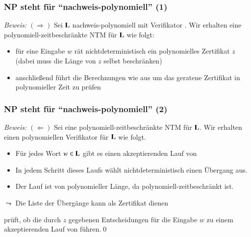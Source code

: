 \documentclass[onlymath]{beamer}
\begin{document}
\begin{frame}[t]\frametitle{NP steht für "`nachweis-polynomiell"' (1)}

\medskip\pause

\emph{Beweis:}
$(\Rightarrow)$ Sei $\textbf{\textcolor{black}{L}}$ nachweis-polynomiell mit Verifikator . Wir erhalten eine polynomiell-zeitbeschränkte NTM  für $\textbf{\textcolor{black}{L}}$ wie folgt:\pause
\begin{itemize}
\item für eine Eingabe $w$ rät  nichtdeterministisch ein polynomielles Zertifikat $z$\\
(dabei muss  die Länge von $z$ selbst beschränken)
\item anschließend führt  die Berechnungen wie  aus um das geratene Zertifikat in polynomieller Zeit zu prüfen
\end{itemize}

\end{frame}

\begin{frame}[t]\frametitle{NP steht für "`nachweis-polynomiell"' (2)}

\medskip

\emph{Beweis:}
$(\Leftarrow)$ Sei  eine polynomiell-zeitbeschränkte NTM für $\textbf{\textcolor{black}{L}}$. Wir erhalten einen polynomiellen Verifikator  für $\textbf{\textcolor{black}{L}}$ wie folgt.\pause
% 
\begin{itemize}
\item Für jedes Wort $w\in\textbf{\textcolor{black}{L}}$ gibt es einen akzeptierenden Lauf von 
\item In jedem Schritt dieses Laufs wählt  nichtdeterministisch einen Übergang aus.
\item Der Lauf ist von polynomieller Länge, da  polynomiell-zeitbeschränkt ist.
\end{itemize}\pause
$\leadsto$ Die Liste der Übergänge kann als Zertifikat dienen
\medskip

 prüft, ob die durch $z$ gegebenen Entscheidungen für die Eingabe $w$ zu einem akzeptierenden Lauf von  führen.\qed 

\end{frame}
\end{document}
